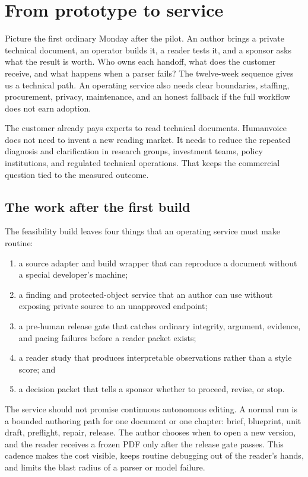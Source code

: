 \chapter{From prototype to service}
\label{ch:operating-plan}

Picture the first ordinary Monday after the pilot. An author brings a private
technical document, an operator builds it, a reader tests it, and a sponsor
asks what the result is worth. Who owns each handoff, what does the customer
receive, and what happens when a parser fails? The twelve-week sequence gives us
a technical path. An operating service also needs clear boundaries, staffing,
procurement, privacy, maintenance, and an honest fallback if the full workflow
does not earn adoption.

The customer already pays experts to read technical documents. Humanvoice does
not need to invent a new reading market. It needs to reduce the repeated
diagnosis and clarification in research groups, investment teams, policy
institutions, and regulated technical operations. That keeps the commercial
question tied to the measured outcome.

\section{The work after the first build}
\label{sec:ops-work}

The feasibility build leaves four things that an operating service must make
routine:

\begin{enumerate}
\item a source adapter and build wrapper that can reproduce a document without
      a special developer's machine;
\item a finding and protected-object service that an author can use without
      exposing private source to an unapproved endpoint;
\item a pre-human release gate that catches ordinary integrity, argument,
      evidence, and pacing failures before a reader packet exists;
\item a reader study that produces interpretable observations rather than a
      style score; and
\item a decision packet that tells a sponsor whether to proceed, revise, or
      stop.
\end{enumerate}

The service should not promise continuous autonomous editing. A normal run is a
bounded authoring path for one document or one chapter: brief, blueprint, unit
draft, preflight, repair, release. The author chooses when to open a new
version, and the reader receives a frozen PDF only after the release gate
passes. This cadence makes the cost visible, keeps routine debugging out of the
reader's hands, and limits the blast radius of a parser or model failure.

